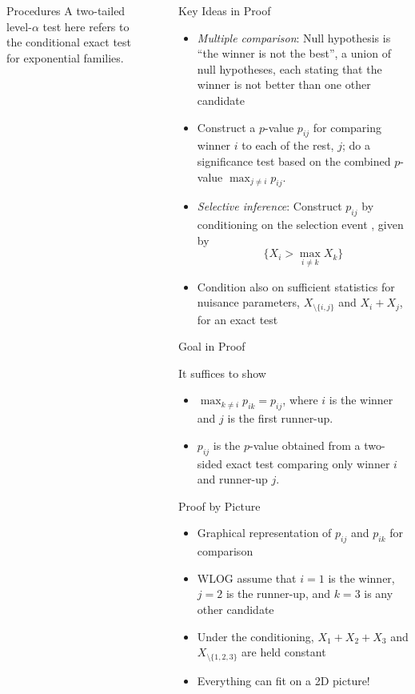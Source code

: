 \documentclass[final]{beamer}
\newlength{\sepwid}
\newlength{\onecolwid}
\begin{document}
\begin{frame}[t]
\begin{columns}[t]
\begin{column}{\onecolwid}
\begin{alertblock}{Procedures}
A two-tailed level-$\alpha$ test here refers to the conditional exact test for exponential families.

\end{alertblock}

\end{column}

\begin{column}{\sepwid}\end{column}

\begin{column}{\onecolwid}

\begin{block}{Key Ideas in Proof}

\begin{itemize}
	\item {\em Multiple comparison}: Null hypothesis is ``the winner is not the best'', a union of null hypotheses, each stating that the winner is not better than one other candidate
	\item Construct a $p$-value $p_{ij}$ for comparing winner $i$ to each of the rest, $j$; do a significance test based on the combined $p$-value $\max_{j \ne i} p_{ij}$.
	\item {\em Selective inference}: Construct $p_{ij}$ by conditioning on the selection event \citep{Fithian:2014ws}, given by
	\[
	\{X_i > \max_{i \ne k} X_k\}
	\]
	\item Condition also on sufficient statistics for nuisance parameters, $X_{\setminus\{i, j\}}$ and $X_i + X_j$, for an exact test
\end{itemize}

\end{block}

\begin{alertblock}{Goal in Proof}

It suffices to show
\begin{itemize}
	\item $\max_{k \ne i} p_{ik} = p_{ij}$, where $i$ is the winner and $j$ is the first runner-up.
	\item $p_{ij}$ is the $p$-value obtained from a two-sided exact test comparing only winner $i$ and runner-up $j$.
\end{itemize}

\end{alertblock}

\begin{block}{Proof by Picture}
\begin{itemize}
	\item Graphical representation of $p_{ij}$ and $p_{ik}$ for comparison
	\item WLOG assume that $i = 1$ is the winner, $j = 2$ is the runner-up, and $k = 3$ is any other candidate
	\item Under the conditioning, $X_1 + X_2 + X_3$ and $X_{\setminus\{1, 2, 3\}}$ are held constant
	\item Everything can fit on a 2D picture!
\end{itemize}


\end{block}
\end{column}
\end{columns}
\end{frame}
\end{document}
